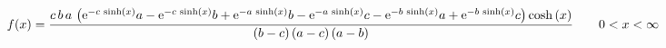 \documentclass[12pt]{article}
\begin{document}
$$  f(x)={\frac {c\,b\,a\, \left( {{\rm e}^{-c\,\sinh \left( x \right) }}a-{
{\rm e}^{-c\,\sinh \left( x \right) }}b+{{\rm e}^{-a\,\sinh \left( x
 \right) }}b-{{\rm e}^{-a\,\sinh \left( x \right) }}c-{{\rm e}^{-b\,
\sinh \left( x \right) }}a+{{\rm e}^{-b\,\sinh \left( x \right) }}c
 \right) \cosh \left( x \right) }{ \left( b-c \right)  \left( a-c
 \right)  \left( a-b \right) }}
 \qquad0
 < x < \infty 
$$
\end{document}

